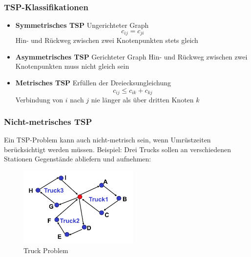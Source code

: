 \documentclass{beamer}
\begin{document}
  \begin{frame}
    \frametitle{TSP-Klassifikationen}
    \begin{itemize}[<+->]
      \item \textbf{Symmetrisches TSP}
        \linebreak
        Ungerichteter Graph
        $$c_{ij} = c_{ji}$$
        Hin- und Rückweg zwischen zwei Knotenpunkten stets gleich
      \item \textbf{Asymmetrisches TSP}
        \linebreak
        Gerichteter Graph
        Hin- und Rückweg zwischen zwei Knotenpunkten muss nicht gleich sein
      \item \textbf{Metrisches TSP}
        \linebreak
        Erfüllen der Dreiecksungleichung
        $$c_{ij} \le c_{ik} + c_{kj}$$
        Verbindung von $i$ nach $j$ nie länger als über dritten Knoten $k$
    \end{itemize}
  \end{frame}

  \begin{frame}
    \frametitle{Nicht-metrisches TSP}
    Ein TSP-Problem kann auch nicht-metrisch sein, wenn Umrüstzeiten
    berücksichtigt werden müssen.
    \pause
    \linebreak
    Beispiel: Drei Trucks sollen an verschiedenen Stationen Gegenstände
    abliefern und aufnehmen:
    \begin{figure}
      \centering
      \includegraphics[width=\linewidth,height=150px,keepaspectratio]{truck_problem.png}
      \caption{Truck Problem}
    \end{figure}
  \end{frame}
\end{document}
